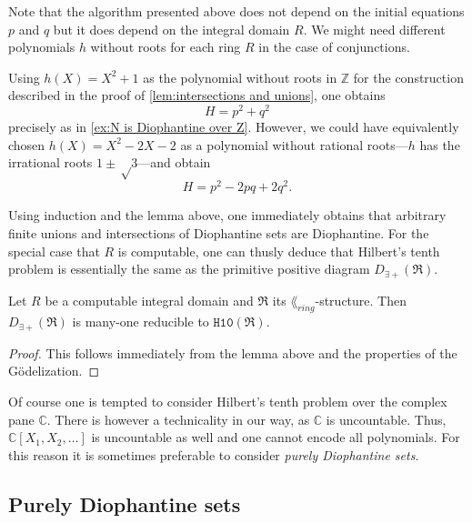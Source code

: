 Note that the algorithm presented above does not depend on the initial equations
\(p\) and \(q\) but it does depend on the integral domain \(R\). We might
need different polynomials \(h\) without roots for each ring \(R\) in the case
of conjunctions.

\begin{rem}
  Using \(h(X) = X^2 + 1\) as the polynomial without roots in \(ℤ\) for the
  construction described in the proof of \cref{lem:intersections and unions},
  one obtains
  \[
    H = p^2 + q^2
  \]
  precisely as in \cref{ex:N is Diophantine over Z}. However, we could have
  equivalently chosen \(h(X) = X^2 - 2X - 2\) as a polynomial without rational
  roots---\(h\) has the irrational roots \(1 ± √3\)---and obtain
  \[
    H = p^2 - 2 pq + 2 q^2.
  \]
\end{rem}

Using induction and the lemma above, one immediately obtains that arbitrary
finite unions and intersections of Diophantine sets are Diophantine. For the
special case that \(R\) is computable, one can thusly deduce that Hilbert's
tenth problem is essentially the same as the primitive positive diagram
\(D_{∃+}(\mathfrak{R})\).

\begin{cor}
  Let \(R\) be a computable integral domain and \(\mathfrak{R}\) its
  \(\lang_{ring}\)-structure. Then \(D_{∃+}(\mathfrak{R})\) is many-one
  reducible to \(\mathtt{H10}(\mathfrak{R})\).
\end{cor}
\begin{proof}
  This follows immediately from the lemma above and the properties of the
  Gödelization.
\end{proof}

Of course one is tempted to consider Hilbert's tenth problem over the complex
pane \(ℂ\). There is however a technicality in our way, as \(ℂ\) is uncountable.
Thus, \(ℂ[X_1, X_2, …]\) is uncountable as well and one cannot encode all
polynomials. For this reason it is sometimes preferable to consider \emph{purely
Diophantine sets}.

\subsection{Purely Diophantine sets}

